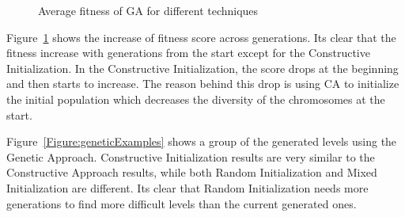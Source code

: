 \documentclass[letterpaper]{article}
\newcommand{\figref}[1]{Figure~\ref{Figure:#1}}
\begin{document}
\begin{figure}[ht]
  	\centering
    \caption{Average fitness of GA for different techniques}
    \label{Figure:geneticImprovement}
\end{figure}

\figref{geneticImprovement} shows the increase of fitness score across generations. Its clear that the fitness increase with generations from the start except for the Constructive Initialization. In the Constructive Initialization, the score drops at the beginning and then starts to increase. The reason behind this drop is using CA to initialize the initial population which decreases the diversity of the chromosomes at the start.\\\par

\figref{geneticExamples} shows a group of the generated levels using the Genetic Approach. Constructive Initialization results are very similar to the Constructive Approach results, while both Random Initialization and Mixed Initialization are different. Its clear that Random Initialization needs more generations to find more difficult levels than the current generated ones.
\end{document}
